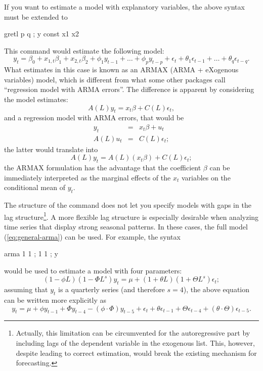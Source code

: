If you want to estimate a model with explanatory variables, the above
syntax must be extended to
\begin{code}
  gretl p q ; y const x1 x2
\end{code}
This command would estimate the following model:
\[
  y_t = \beta_0 + x_{1,t} \beta_1 + x_{2,t} \beta_2 + 
  \phi_1 y_{t-1} + \ldots + \phi_p y_{t-p} + 
  \epsilon_t + \theta_1 \epsilon_{t-1} + \ldots + \theta_q \epsilon_{t-q} .
\]
What  estimates in this case is known as an ARMAX (ARMA +
eXogenous variables) model, which is different from what some other packages
call ``regression model with ARMA errors''. The difference is apparent
by considering the model  estimates:
\begin{equation}
  \label{eq:armax}
  A(L) y_t = x_t \beta + C(L) \epsilon_t ,
\end{equation}
and a regression model with ARMA errors, that would be
\begin{eqnarray}
  \label{eq:reg-arma}
  y_t & = & x_t \beta + u_t \\
  A(L) u_t & = & C(L) \epsilon_t ;
\end{eqnarray}
the latter would translate into
\[
  A(L) y_t = A(L) \left(x_t \beta \right) + C(L) \epsilon_t ;
\]
the ARMAX formulation has the advantage that the coefficient $\beta$
can be immediately interpreted as the marginal effects of the $x_t$
variables on the conditional mean of $y_t$.

The structure of the  command does not let you specify
models with gaps in the lag structure\footnote{Actually, this
  limitation can be circumvented for the autoregressive part by
  including lags of the dependent variable in the exogenous list.
  This, however, despite leading to correct estimation, would break
  the existing mechanism for forecasting.}. A more flexible lag
structure is especially desirable when analyzing time series that
display strong seasonal patterns. In these cases, the full model
(\ref{eq:general-arma}) can be used. For example, the syntax
\begin{code}
  arma 1 1 ; 1 1 ; y
\end{code}
would be used to estimate a model with four parameters:
\[
  ( 1 - \phi L )  ( 1 - \Phi L^s ) y_t = \mu + ( 1 + \theta L ) ( 1 + \Theta L^s ) \epsilon_t;
\]
assuming that $y_t$ is a quarterly series (and therefore $s=4$), the
above equation can be written more explicitly as
\[
  y_t = \mu + \phi y_{t-1} + \Phi y_{t-4} - (\phi \cdot \Phi) y_{t-5} + 
  \epsilon_t + \theta \epsilon_{t-1} + \Theta \epsilon_{t-4} +
  (\theta \cdot \Theta) \epsilon_{t-5} .
\]

